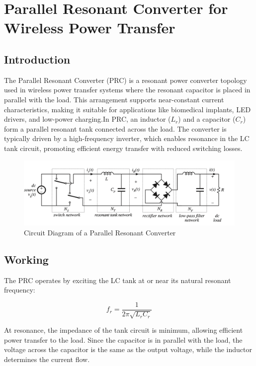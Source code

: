 \documentclass[12pt,a4paper]{report}
\begin{document}

\chapter{Parallel Resonant Converter for Wireless Power Transfer}
\vspace{1cm}
\section{Introduction}
\quad The Parallel Resonant Converter (PRC) is a resonant power converter topology used in wireless power transfer systems where the resonant capacitor is placed in parallel with the load. This arrangement supports near-constant current characteristics, making it suitable for applications like biomedical implants, LED drivers, and low-power charging.In PRC, an inductor (\(L_r\)) and a capacitor (\(C_r\)) form a parallel resonant tank connected across the load. The converter is typically driven by a high-frequency inverter, which enables resonance in the LC tank circuit, promoting efficient energy transfer with reduced switching losses.\cite{erickson2020resonant}\cite{li2022singleended}


\begin{figure}
        \centering
        \includegraphics[width=0.65\linewidth]{6677.png}
      
        \caption{Circuit Diagram of a Parallel Resonant Converter}
\end{figure}

\section{Working }

\quad The PRC operates by exciting the LC tank at or near its natural resonant frequency:

\[
f_r = \frac{1}{2\pi \sqrt{L_r C_r}}
\]

At resonance, the impedance of the tank circuit is minimum, allowing efficient power transfer to the load. Since the capacitor is in parallel with the load, the voltage across the capacitor is the same as the output voltage, while the inductor determines the current flow.\cite{irivennela2020wireless}
\end{document}
